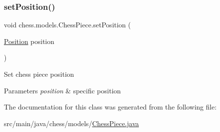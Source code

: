 \subsubsection{\texorpdfstring{set\+Position()}{setPosition()}}
{\footnotesize\ttfamily void chess.\+models.\+Chess\+Piece.\+set\+Position (\begin{DoxyParamCaption}\item[{\mbox{\hyperlink{classchess_1_1models_1_1_position}{Position}}}]{position }\end{DoxyParamCaption})}

Set chess piece position


\begin{DoxyParams}{Parameters}
{\em position} & specific position \\
\hline
\end{DoxyParams}


The documentation for this class was generated from the following file\+:\begin{DoxyCompactItemize}
\item 
src/main/java/chess/models/\mbox{\hyperlink{_chess_piece_8java}{Chess\+Piece.\+java}}\end{DoxyCompactItemize}
